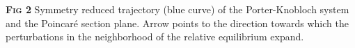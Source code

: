 \color{black}
{\footnotesize
\textbf{\textsc{Fig 2}} Symmetry reduced trajectory (blue curve) of the 
Porter-Knobloch system and the Poincar\'e section plane. Arrow points to the 
direction towards which the perturbations in the neighborhood of the relative 
equilibrium expand.}
